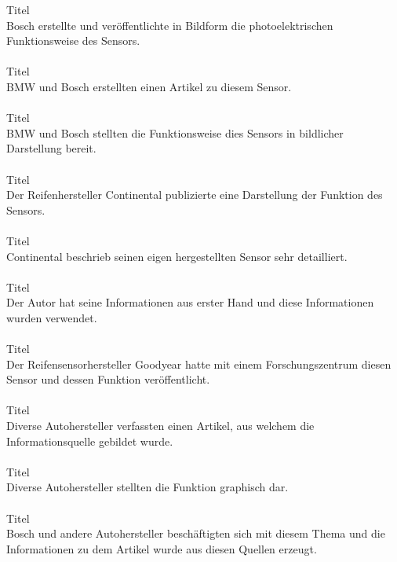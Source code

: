 Titel \cite{TS_dreh_pic_photo}\\
Bosch erstellte und veröffentlichte in Bildform die photoelektrischen Funktionsweise des Sensors.\\\\

Titel \cite{TS_regen}\\
BMW und Bosch erstellten einen Artikel zu diesem Sensor.\\\\

Titel \cite{TS_regen_pic}\\
BMW und Bosch stellten die Funktionsweise dies Sensors in bildlicher Darstellung bereit.\\\\

Titel \cite{TS_swt_pic}\\
Der Reifenhersteller Continental publizierte eine Darstellung der Funktion des Sensors.\\\\

Titel \cite{TS_swt}\\
Continental beschrieb seinen eigen hergestellten Sensor sehr detailliert.\\\\

Titel \cite{TS_l_q_k_pic}\\
Der Autor hat seine Informationen aus erster Hand und diese Informationen wurden verwendet.\\\\

Titel \cite{TS_reifen}\\
Der Reifensensorhersteller Goodyear hatte mit einem Forschungszentrum diesen Sensor und dessen Funktion veröffentlicht.\\\\

Titel \cite{TS_rdks}\\
Diverse Autohersteller verfassten einen Artikel, aus welchem die Informationsquelle gebildet wurde.\\\\

Titel \cite{TS_rdks_pic}\\
Diverse Autohersteller stellten die Funktion graphisch dar.\\\\

Titel \cite{TS_hall}\\
Bosch und andere Autohersteller beschäftigten sich mit diesem Thema und die Informationen zu dem Artikel wurde aus diesen Quellen erzeugt.\\\\

